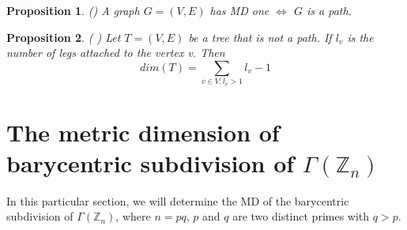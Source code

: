 \documentclass[]{interact}
\theoremstyle{plain}%
\newtheorem{proposition}{Proposition}[section]
\theoremstyle{definition}
\theoremstyle{remark}
\begin{document}
\noindent\begin{proposition} (\cite{kh})
A graph $G=(V, E)$ has MD one $\iff$ $G$  is a path.
\end{proposition}
\noindent \begin{proposition}(\cite{kh} \label{0})
     Let $T = (V, E)$ be a tree that is not a path. If $l_v$ is the number of legs attached to the
vertex v. Then
\[ dim(T ) =  \sum_{ v \in V:l_v>1  } l_v-1\]
 \end{proposition}
\section{ The metric dimension of barycentric subdivision of  $\Gamma(\mathbb{Z}_n)$}
\noindent In this particular section, we will determine the MD of the barycentric subdivision of $\Gamma(\mathbb{Z}_n)$, where $n=pq$, $p$ and $q$ are two distinct primes with $q>p$.
\end{document}
